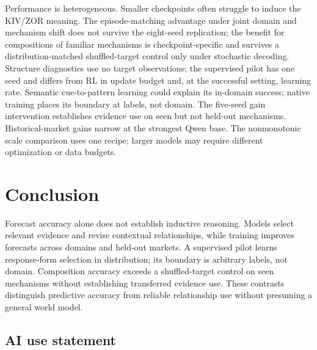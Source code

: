 \documentclass{article}
\begin{document}
Performance is heterogeneous. Smaller checkpoints often struggle to induce the
KIV/ZOR meaning. The episode-matching advantage under joint domain and mechanism
shift does not survive the eight-seed replication; the benefit for compositions
of familiar mechanisms is checkpoint-specific and survives a
distribution-matched shuffled-target control only under stochastic decoding. Structure diagnostics use no target
observations; the supervised pilot has one seed and differs from RL in update
budget and, at the successful setting, learning rate. Semantic cue-to-pattern
learning could explain its in-domain success; native training places its
boundary at labels, not domain. The five-seed gain intervention establishes
evidence use on seen but not held-out mechanisms.
Historical-market gains narrow at the strongest Qwen base. The nonmonotonic
scale comparison uses one recipe; larger models may require different
optimization or data budgets.
\section{Conclusion}
\label{sec:conclusion}

Forecast accuracy alone does not establish inductive reasoning. Models select
relevant evidence and revise contextual relationships, while training improves
forecasts across domains and held-out markets. A supervised pilot learns
response-form selection in distribution; its boundary is arbitrary labels, not
domain. Composition accuracy exceeds a shuffled-target control on seen
mechanisms without establishing transferred evidence use. These contrasts distinguish predictive accuracy from
reliable relationship use without presuming a general world model.
\subsection*{AI use statement}
\end{document}
